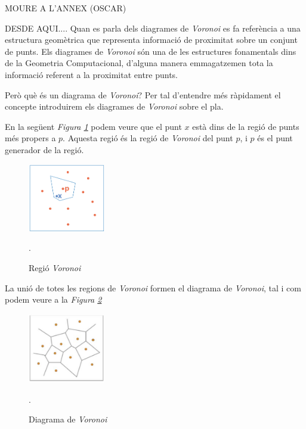 \documentclass[12pt]{article}
\begin{document}
MOURE A L'ANNEX (OSCAR)

DESDE AQUI....
Quan es parla dels diagrames de \textit{Voronoi} es fa referència a una estructura geomètrica que representa informació de proximitat sobre un conjunt de punts. Els diagrames de \textit{Voronoi} són una de les estructures fonamentals dins de la Geometria Computacional, d’alguna manera emmagatzemen tota la informació referent a la proximitat entre punts.

Però què és un diagrama de \textit{Voronoi}? Per tal d’entendre més ràpidament el concepte introduirem els diagrames de \textit{Voronoi} sobre el pla.

En la següent \textit{Figura \ref{fig:regio_voronoi}} podem veure que el punt $x$ està dins de la regió de punts més propers a $p$. Aquesta regió és la regió de \textit{Voronoi} del punt $p$, i $p$ és el punt generador de la regió.

\begin{figure}[H]
	\centering
	\includegraphics[width=0.3\textwidth]{imatges/regio_voronoi.png}\par\vspace{1cm}
	\caption{Regió \textit{Voronoi}}.
	\label{fig:regio_voronoi}
\end{figure}

La unió de totes les regions de \textit{Voronoi} formen el diagrama de \textit{Voronoi}, tal i com podem veure a la \textit{Figura \ref{fig:diagrama_voronoi}}

\begin{figure}[H]
	\centering
	\includegraphics[width=0.3\textwidth]{imatges/diagrama_voronoi.png}\par\vspace{1cm}
	\caption{Diagrama de \textit{Voronoi}}.
	\label{fig:diagrama_voronoi}
\end{figure}
\end{document}
